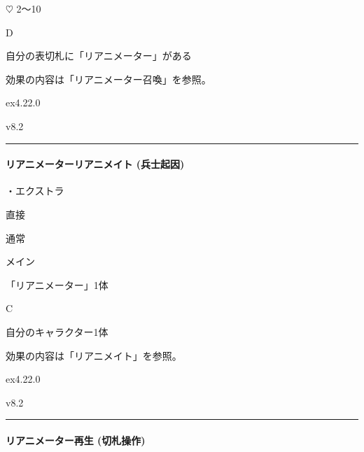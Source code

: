\documentclass[letterpaper,10pt,dvipdfmx]{sphinxmanual}
\begin{document}
\sphinxAtStartPar
{} {\normalsize $\heartsuit$} 2〜10

\sphinxAtStartPar
{} D

\sphinxAtStartPar
{}

\sphinxAtStartPar
自分の表切札に「リアニメーター」がある

\sphinxAtStartPar
{}

\sphinxAtStartPar
効果の内容は「リアニメーター召喚」を参照。

\sphinxAtStartPar
{}  ex4.22.0

\sphinxAtStartPar
{}  v8.2


\bigskip\hrule\bigskip



\paragraph{リアニメーターリアニメイト (兵士起因)}
\label{\detokenize{auto/frameActionlist:act-reanimatorreanimate}}\label{\detokenize{auto/frameActionlist:id27}}
\sphinxAtStartPar
{}

\sphinxAtStartPar
・エクストラ

\sphinxAtStartPar
{} 直接

\sphinxAtStartPar
{} 通常

\sphinxAtStartPar
{} メイン

\sphinxAtStartPar
{} 「リアニメーター」1体

\sphinxAtStartPar
{} C

\sphinxAtStartPar
{}

\sphinxAtStartPar
自分のキャラクター1体

\sphinxAtStartPar
{}

\sphinxAtStartPar
効果の内容は「リアニメイト」を参照。

\sphinxAtStartPar
{}  ex4.22.0

\sphinxAtStartPar
{}  v8.2


\bigskip\hrule\bigskip



\paragraph{リアニメーター再生 (切札操作)}
\label{\detokenize{auto/frameActionlist:act-reanimatorrevive}}\label{\detokenize{auto/frameActionlist:id28}}
\sphinxAtStartPar
{}
\end{document}

